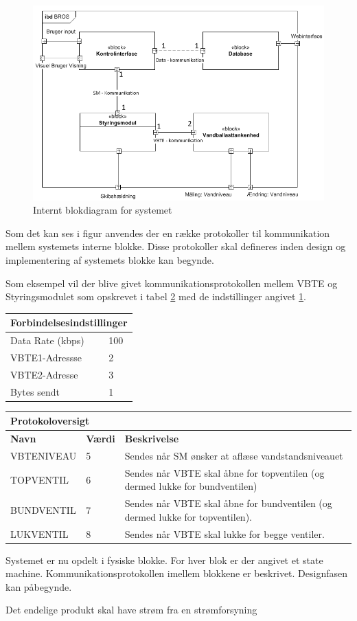 \begin{figure}[H]
\centering
\includegraphics[scale=0.8]{billeder/Systemarkitektur/ibd_bros}
\caption{Internt blokdiagram for systemet}
\label{fig:idb_bros}
\end{figure}

Som det kan ses i figur anvendes der en række protokoller til kommunikation mellem systemets interne blokke. Disse protokoller skal defineres inden design og implementering af systemets blokke kan begynde.

Som eksempel vil der blive givet kommunikationsprotokollen mellem VBTE og Styringsmodulet som opskrevet i tabel \ref{tabel:protokoloversigt} med de indstillinger angivet \ref{tabel:forbindelsesindstillinger}.


\begin{table}[H]
\centering
\begin{tabular}{|l|l|}
\multicolumn{2}{l}{{\Large Forbindelsesindstillinger}} \\\hline
Data Rate (kbps)&100\\\hline
VBTE1-Adressse&2\\\hline
VBTE2-Adresse&3\\\hline
Bytes sendt&1\\\hline
\end{tabular}
\label{tabel:forbindelsesindstillinger}
\end{table}

\begin{table}[htbp]
\centering
\begin{tabular}{|l|l|p{10cm}|}
\multicolumn{2}{l}{{\Large Protokoloversigt}} \\\hline
\hline
\textbf{Navn} &\textbf{Værdi} &\textbf{Beskrivelse}\\\hline
VBTENIVEAU&5&Sendes når SM ønsker at aflæse vandstandsniveauet\\\hline
TOPVENTIL&6&Sendes når VBTE skal åbne for topventilen (og dermed lukke for bundventilen)\\\hline
BUNDVENTIL&7&Sendes når VBTE skal åbne for bundventilen (og dermed lukke for topventilen).\\\hline
LUKVENTIL&8&Sendes når VBTE skal lukke for begge ventiler.\\\hline
\end{tabular}
\label{tabel:protokoloversigt}
\end{table}

Systemet er nu opdelt i fysiske blokke. For hver blok er der angivet et state machine. Kommunikationsprotokollen imellem blokkene er beskrivet. Designfasen kan påbegynde.

Det endelige produkt skal have strøm fra en strømforsyning \fxnote{}


